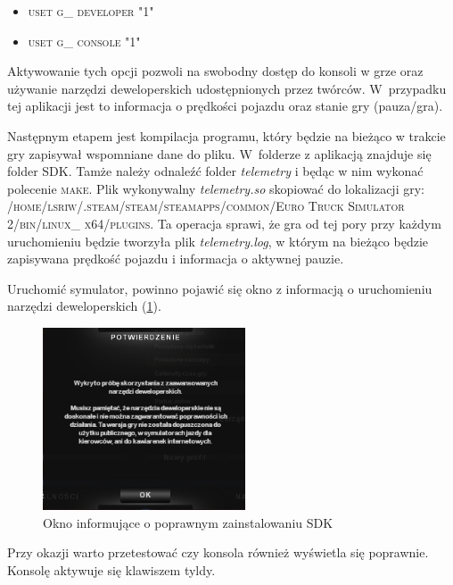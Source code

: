 \begin{itemize}
\item \textsc{uset g\_ developer "1"}
\item \textsc{uset g\_ console "1"}
\end{itemize}

Aktywowanie tych opcji pozwoli na swobodny dostęp do konsoli w grze oraz używanie narzędzi deweloperskich udostępnionych przez twórców. 
W~przypadku tej aplikacji jest to informacja o prędkości pojazdu oraz stanie gry (pauza/gra). %

Następnym etapem jest kompilacja programu, który będzie na bieżąco w trakcie gry zapisywał wspomniane dane do pliku.
W~folderze z aplikacją znajduje się folder SDK. %
Tamże należy odnaleźć folder \textit{telemetry} i będąc w nim wykonać polecenie \textsc{make}. %
Plik wykonywalny \textit{telemetry.so} skopiować do lokalizacji gry: \textsc{/home/lsriw/.steam/steam/steamapps/common/Euro Truck Simulator 2/bin/linux\_ x64/plugins}.
Ta operacja sprawi, że gra od tej pory przy każdym uruchomieniu będzie tworzyła plik \textit{telemetry.log}, w którym na bieżąco będzie zapisywana prędkość pojazdu i informacja o aktywnej pauzie. 

Uruchomić symulator, powinno pojawić się okno z informacją o uruchomieniu narzędzi deweloperskich (\ref{fig:appendix1_dev_tools}).

\begin{figure}
  \centering
  \includegraphics[width=6cm]{img/appendix1_devtools.png}
  \caption{Okno informujące o poprawnym zainstalowaniu SDK}
  \label{fig:appendix1_dev_tools}
\end{figure}

Przy okazji warto przetestować czy konsola również wyświetla się poprawnie. 
Konsolę aktywuje się klawiszem tyldy.

